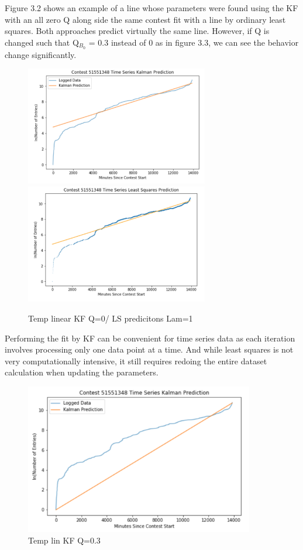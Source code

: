 Figure 3.2 shows an example of a line whose parameters were found using the KF with an all zero Q along side the same contest fit with a line by ordinary least squares. Both approaches predict virtually the same line. However, if Q is changed such that Q$_{B_{0}}$ = 0.3  instead of 0 as in figure 3.3, we can see the behavior change significantly.

\begin{figure}[h]
\centering
\includegraphics[width=8cm]{body/methodology/KF_Q0.png}
\includegraphics[width=8cm]{body/methodology/LS_pred.png}
\caption{Temp linear KF Q=0/ LS predicitons Lam=1}
\end{figure}

Performing the fit by KF can be convenient for time series data as each iteration involves processing only one data point at a time. And while least squares is not very computationally intensive, it still requires redoing the entire dataset calculation when updating the parameters.

\begin{figure}[h]
\centering
\includegraphics[width=10cm]{body/methodology/KF_Q3.png}
\caption{Temp lin KF Q=0.3}
\end{figure}

